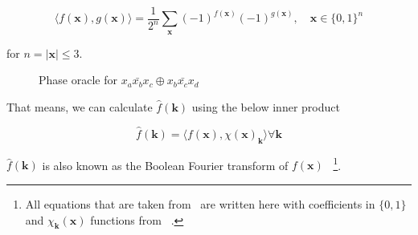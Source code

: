 \begin{equation}
  \label{eq-inner-prod}
  \langle f(\mathbf{x}) , g(\mathbf{x}) \rangle = \frac{1}{2^n} \sum_{\mathbf{x}} (-1)^{f(\mathbf{x})} (-1)^{g(\mathbf{x})}, \quad \mathbf{x} \in \{0,1\}^n
\end{equation}

for $n = |\mathbf{x}| \leq 3$.
\begin{figure}[t]
  \centering
  \begin{minipage}{\textwidth}
    \centering
    \scalebox{0.9} {
      
    }
  \end{minipage}
  \caption{Phase oracle for $x_a \bar{x_b} x_c \oplus x_b \bar{x_c} x_d$}
  \label{fig-series-all}
  \vspace{-0.5cm}  
\end{figure}

That means, we can calculate $\hat{f}(\mathbf{k})$ using the below inner product

\begin{equation}
  \label{eq-fhat-prod}
  \hat{f}(\mathbf{k}) = \langle f(\mathbf{x}), \chi(\mathbf{x})_{\mathbf{k}} \rangle \forall \mathbf{k} 
\end{equation}

$\hat{f}(\mathbf{k})$ is also known as the Boolean Fourier transform of $f(\mathbf{x})$~\cite{bib-odonnell}
\footnote{All equations that are taken from~\cite{bib-odonnell} are written here
with coefficients in $\{0,1\}$ and $\chi_{\mathbf{k}}(\mathbf{x})$ functions from ~\cite{bib-amy-matroid}.}.

